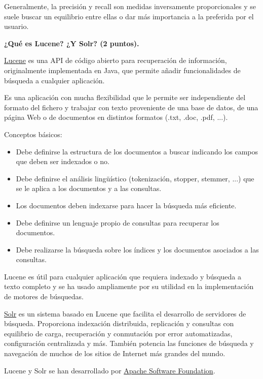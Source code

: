 \documentclass[11pt]{exam}
\begin{document}
\begin{questions}
Generalmente, la precisión y recall son medidas inversamente proporcionales y se suele buscar un equilibrio entre ellas o dar más importancia a la preferida por el usuario.

{\bf \question ¿Qué es Lucene? ¿Y Solr? (2 puntos).}

\href{https://lucene.apache.org/core/}{Lucene} es una API de código abierto para recuperación de información, originalmente implementada en Java, que permite añadir funcionalidades de búsqueda a cualquier aplicación. 

Es una aplicación con mucha flexibilidad que le permite ser independiente del formato del fichero y trabajar con texto proveniente de una base de datos, de una página Web o de documentos en distintos formatos (.txt, .doc, .pdf, ...).

\newpage

Conceptos básicos:

\begin{itemize}
	\item Debe definirse la estructura de los documentos a buscar indicando los	campos que deben ser indexados o no.
	\item Debe definirse el análisis lingüístico (tokenización, stopper, stemmer, ...) que se le aplica a los documentos y a las consultas.
	\item Los documentos deben indexarse para hacer la búsqueda más eficiente.
	\item Debe definirse un lenguaje propio de consultas para recuperar los documentos.
	\item Debe realizarse la búsqueda sobre los índices y los documentos asociados a las consultas.
\end{itemize}

Lucene es útil para cualquier aplicación que requiera indexado y búsqueda a texto completo y se ha usado ampliamente por su utilidad en la implementación de motores de búsquedas.  

\href{https://lucene.apache.org/solr/}{Solr} es un sistema basado en Lucene que facilita el desarrollo de servidores de búsqueda. Proporciona indexación distribuida, replicación y consultas con equilibrio de carga, recuperación y conmutación por error automatizadas, configuración centralizada y más. También potencia las funciones de búsqueda y navegación de muchos de los sitios de Internet más grandes del mundo.

Lucene y Solr se han desarrollado por \href{http://www.apache.org/}{Apache Software Foundation}.


\end{questions}
\end{document}

